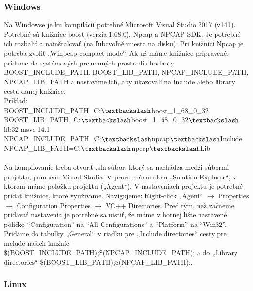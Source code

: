 \documentclass[a4paper,12pt]{article}
\begin{document}
\subsubsection{Windows}

Na Windowse je ku kompilácií potrebné Microsoft Visual Studio 2017 (v141).
Potrebné sú knižnice boost (verzia 1.68.0), Npcap a NPCAP SDK. Je potrebné ich rozbaliť  a nainštalovať (na ľubovoľné miesto na disku).  Pri knižnici Npcap je potreba zvoliť „Winpcap compact mode“. Ak už máme knižnice pripravené, pridáme do systémových premenných prostredia hodnoty BOOST\_INCLUDE\_PATH, BOOST\_LIB\_PATH, NPCAP\_INCLUDE\_PATH, NPCAP\_LIB\_PATH a nastavíme ich, aby ukazovali na include alebo library cestu danej knižnice.
\\
Príklad: \\
BOOST\_INCLUDE\_PATH=C:$\textbackslash$boost\_1\_68\_0\_32 \\
BOOST\_LIB\_PATH=C:$\textbackslash$boost\_1\_68\_0\_32$\textbackslash$lib32-msvc-14.1 \\
NPCAP\_INCLUDE\_PATH=C:$\textbackslash$npcap$\textbackslash$Include \\
NPCAP\_LIB\_PATH=C:$\textbackslash$npcap$\textbackslash$Lib \\
\\
Na kompilovanie treba otvoriť .sln súbor, ktorý sa nachádza medzi súbormi projektu, pomocou Visual Studia. V pravo máme okno „Solution Explorer“, v ktorom máme položku projektu („Agent“). V nastaveniach projektu je potrebné pridať knižnice, ktoré využívame. Navigujeme:
Right-click „Agent“ $\rightarrow$ Properties $\rightarrow$ Configuration Properties $\rightarrow$ VC++ Directories.
Pred tým, než začneme pridávať nastavenia je potrebné sa uistiť, že máme v hornej lište nastavené políčko “Configuration” na “All Configurations” a “Platform” na “Win32”. Pridáme do tabuľky „General“ v riadku pre „Include directories“ cesty pre include našich knižníc - \$(BOOST\_INCLUDE\_PATH);\$(NPCAP\_INCLUDE\_PATH);  a do „Library directories“ \$(BOOST\_LIB\_PATH);\$(NPCAP\_LIB\_PATH);. 

\subsubsection{Linux}
\end{document}
